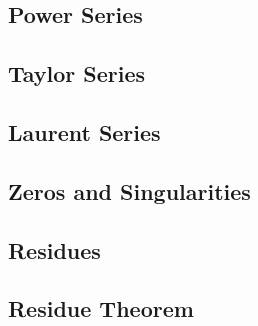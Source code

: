 \subsection{Power Series}

\subsection{Taylor Series}

\subsection{Laurent Series}

\subsection{Zeros and Singularities}

\subsection{Residues}

\subsection{Residue Theorem}

